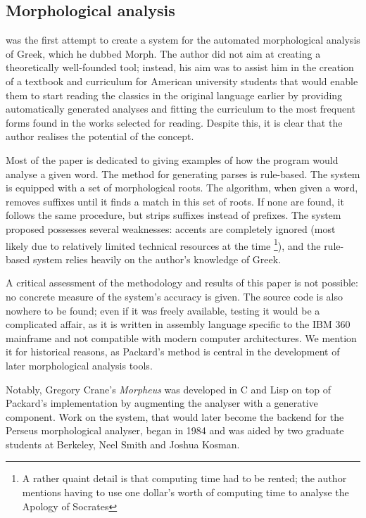 \subsection{Morphological analysis}
\cite{packard1973computer} was the first attempt to create a system
for the automated morphological analysis of Greek, which he dubbed
Morph. The author did not aim at creating a theoretically well-founded
tool; instead, his aim was to assist him in the creation of a textbook
and curriculum for American university students that would enable them
to start reading the classics in the original language earlier by
providing automatically generated analyses and fitting the curriculum
to the most frequent forms found in the works selected for
reading. Despite this, it is clear that the author realises the
potential of the concept.

Most of the paper is dedicated to giving examples of how the program
would analyse a given word. The method for generating parses is
rule-based. The system is equipped with a set of morphological roots.
The algorithm, when given a word, removes suffixes until it finds a
match in this set of roots. If none are found, it follows the same
procedure, but strips suffixes instead of prefixes. The system
proposed possesses several weaknesses: accents are completely ignored
(most likely due to relatively limited technical resources at the time
\footnote{A rather quaint detail is that computing time had to be
rented; the author mentions having to use one dollar's worth of
computing time to analyse the Apology of Socrates}), and the rule-based
system relies heavily on the author's knowledge of Greek.

A critical assessment of the methodology and results of this paper is
not possible: no concrete measure of the system's accuracy is
given. The source code is also nowhere to be found; even if it was
freely available, testing it would be a complicated affair, as it is
written in assembly language specific to the IBM 360 mainframe and not
compatible with modern computer architectures. We mention it for
historical reasons, as Packard's method is central in the development
of later morphological analysis tools. 

Notably, Gregory Crane's \textit{Morpheus} was developed in C and Lisp
on top of Packard's implementation by augmenting the analyser with a
generative component. Work on the system, that would later become the
backend for the Perseus morphological analyser, began in 1984 and was
aided by two graduate students at Berkeley, Neel Smith and Joshua
Kosman.

